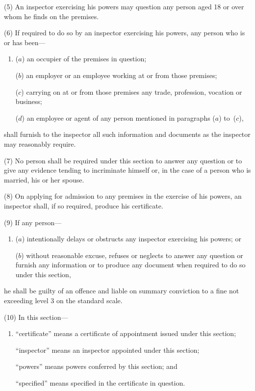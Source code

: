 \documentclass[12pt,a4paper]{article}
\begin{document}
(5) An inspector exercising his powers may question any person aged 18 or over whom he finds on the premises.

(6) If required to do so by an inspector exercising his powers, any person who is or has been—
\begin{enumerate}\item[]
($a$) an occupier of the premises in question;

($b$) an employer or an employee working at or from those premises;

($c$) carrying on at or from those premises any trade, profession, vocation or business;

($d$) an employee or agent of any person mentioned in paragraphs ($a$)  to~($c$),
\end{enumerate}
shall furnish to the inspector all such information and documents as the inspector may reasonably require.

(7) No person shall be required under this section to answer any question or to give any evidence tending to incriminate himself or, in the case of a person who is married, his or her spouse.

(8) On applying for admission to any premises in the exercise of his powers, an inspector shall, if so required, produce his certificate.

(9) If any person—
\begin{enumerate}\item[]
($a$) intentionally delays or obstructs any inspector exercising his powers; or

($b$) without reasonable excuse, refuses or neglects to answer any question or furnish any information or to produce any document when required to do so under this section,
\end{enumerate}
he shall be guilty of an offence and liable on summary conviction to a fine not exceeding level 3 on the standard scale.

(10) In this section—
\begin{enumerate}\item[]
    “certificate” means a certificate of appointment issued under this section;

    “inspector” means an inspector appointed under this section;

    “powers” means powers conferred by this section; and

    “specified” means specified in the certificate in question. 
\end{enumerate}
\end{document}

